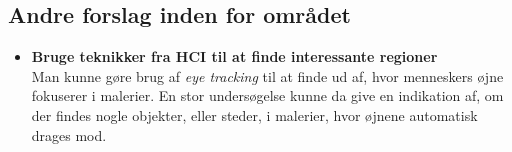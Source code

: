 {\subsection{Andre forslag inden for området}
\begin{itemize}
    \item \textbf{Bruge teknikker fra HCI til at finde interessante regioner}\\
        Man kunne gøre brug af \emph{eye tracking} til at finde ud af,
        hvor menneskers øjne fokuserer i malerier. En stor undersøgelse
        kunne da give en indikation af, om der findes nogle objekter,
        eller steder, i malerier, hvor øjnene automatisk drages mod.
\end{itemize}

}


